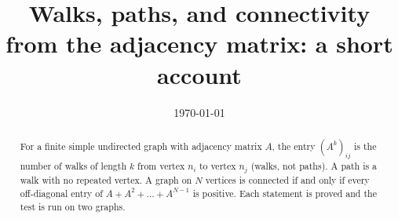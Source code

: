 \documentclass[11pt,a4paper]{article}
\title{Walks, paths, and connectivity from the adjacency matrix: a short account}
\author{}
\date{\today}
\theoremstyle{definition}
\theoremstyle{plain}
\theoremstyle{remark}
\begin{document}
\maketitle

\begin{abstract}
For a finite simple undirected graph with adjacency matrix $A$, the entry
$(A^k)_{ij}$ is the number of walks of length $k$ from vertex $n_i$ to vertex $n_j$
(walks, not paths). A path is a walk with no repeated vertex. A graph on $N$ vertices is
connected if and only if every off-diagonal entry of $A+A^2+\dots+A^{N-1}$ is
positive. Each statement is proved and the test is run on two graphs.
\end{abstract}






\printbibliography
\end{document}

